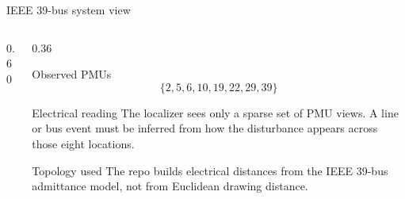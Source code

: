 \documentclass[10pt,aspectratio=169]{beamer}
\begin{document}
\begin{frame}{IEEE 39-bus system view}
\begin{columns}[T,totalwidth=\textwidth]
\begin{column}{0.60\textwidth}
\end{column}
\begin{column}{0.36\textwidth}
\begin{block}{Observed PMUs}
\[
\{2,5,6,10,19,22,29,39\}
\]
\end{block}
\begin{exampleblock}{Electrical reading}
The localizer sees only a sparse set of PMU views. A line or bus event must be inferred from how the disturbance appears across those eight locations.
\end{exampleblock}
\begin{alertblock}{Topology used}
The repo builds electrical distances from the IEEE 39-bus admittance model, not from Euclidean drawing distance.
\end{alertblock}
\end{column}
\end{columns}
\end{frame}
\end{document}
